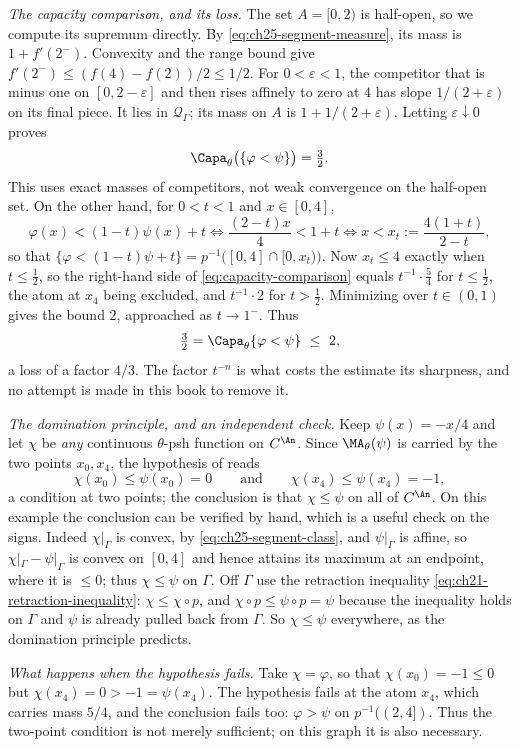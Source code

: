 \begin{example}
\emph{The capacity comparison, and its loss.}  The set \(A=[0,2)\) is half-open, so we compute its supremum directly.
By \eqref{eq:ch25-segment-measure}, its mass is \(1+f'(2^-)\).
Convexity and the range bound give
\(f'(2^-)\leq(f(4)-f(2))/2\leq1/2\).
For \(0<\varepsilon<1\), the competitor that is minus one on
\([0,2-\varepsilon]\) and then rises affinely to zero at \(4\)
has slope \(1/(2+\varepsilon)\) on its final piece.
It lies in \(\mathcal Q_\Gamma\); its mass on \(A\) is
\(1+1/(2+\varepsilon)\).
Letting \(\varepsilon\downarrow0\) proves
\[
 \Capa_\theta\bigl(\{\varphi<\psi\}\bigr)=\tfrac32 .
\]
This uses exact masses of competitors, not weak convergence on the
half-open set.
On the other hand, for \(0<t<1\) and \(x\in[0,4]\),
\[
 \varphi(x)<(1-t)\psi(x)+t
 \iff \frac{(2-t)x}{4}<1+t
 \iff x<x_t:=\frac{4(1+t)}{2-t},
\]
so that \(\{\varphi<(1-t)\psi+t\}=p^{-1}\bigl([0,4]\cap[0,x_t)\bigr)\).  Now
\(x_t\leq4\) exactly when \(t\leq\tfrac12\), so the right-hand side of
\eqref{eq:capacity-comparison} equals \(t^{-1}\cdot\tfrac54\) for
\(t\leq\tfrac12\), the atom at \(x_4\) being excluded, and
\(t^{-1}\cdot2\) for \(t>\tfrac12\).  Minimizing over \(t\in(0,1)\) gives
the bound \(2\), approached as \(t\to1^-\).  Thus
\[
 \tfrac32=\Capa_\theta\{\varphi<\psi\}\ \leq\ 2 ,
\]
a loss of a factor \(4/3\).  The factor \(t^{-n}\) is what costs the
estimate its sharpness, and no attempt is made in this book to remove it.

\emph{The domination principle, and an independent check.}  Keep
\(\psi(x)=-x/4\) and let \(\chi\) be \emph{any} continuous \(\theta\)-psh
function on \(C^{\An}\).  Since \(\MA_\theta(\psi)\) is carried by the two
points \(x_0,x_4\), the hypothesis of
 reads
\[
 \chi(x_0)\leq\psi(x_0)=0
 \qquad\text{and}\qquad
 \chi(x_4)\leq\psi(x_4)=-1 ,
\]
a condition at two points; the conclusion is that \(\chi\leq\psi\) on all of
\(C^{\An}\).  On this example the conclusion can be verified by hand, which
is a useful check on the signs.  Indeed \(\chi|_\Gamma\) is convex, by
\eqref{eq:ch25-segment-class}, and \(\psi|_\Gamma\) is affine, so
\(\chi|_\Gamma-\psi|_\Gamma\) is convex on \([0,4]\) and hence attains its
maximum at an endpoint, where it is \(\leq0\); thus \(\chi\leq\psi\) on
\(\Gamma\).  Off \(\Gamma\) use the retraction inequality
\eqref{eq:ch21-retraction-inequality}: \(\chi\leq\chi\circ p\), and
\(\chi\circ p\leq\psi\circ p=\psi\) because the inequality holds on
\(\Gamma\) and \(\psi\) is already pulled back from \(\Gamma\).  So
\(\chi\leq\psi\) everywhere, as the domination principle predicts.

\emph{What happens when the hypothesis fails.}  Take \(\chi=\varphi\), so
that \(\chi(x_0)=-1\leq0\) but \(\chi(x_4)=0>-1=\psi(x_4)\).  The
hypothesis fails at the atom \(x_4\), which carries mass \(5/4\), and the
conclusion fails too: \(\varphi>\psi\) on \(p^{-1}((2,4])\).  Thus the
two-point condition is not merely sufficient; on this graph it is also
necessary.
\end{example}

